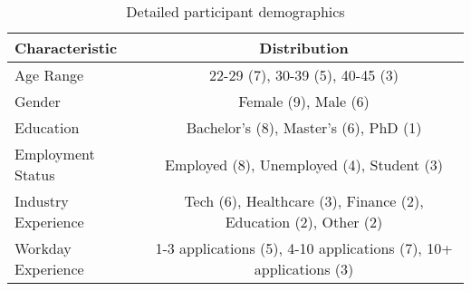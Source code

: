 \documentclass[
	letterpaper, %
]{jdf}
\begin{document}
\begin{sloppypar}
\begin{table}[h]
\centering
\begin{tabular}{|l|c|}
\hline
\textbf{Characteristic} & \textbf{Distribution} \\
\hline
Age Range & 22-29 (7), 30-39 (5), 40-45 (3) \\
\hline
Gender & Female (9), Male (6) \\
\hline
Education & Bachelor's (8), Master's (6), PhD (1) \\
\hline
Employment Status & Employed (8), Unemployed (4), Student (3) \\
\hline
Industry Experience & Tech (6), Healthcare (3), Finance (2), Education (2), Other (2) \\
\hline
Workday Experience & 1-3 applications (5), 4-10 applications (7), 10+ applications (3) \\
\hline
\end{tabular}
\caption{Detailed participant demographics}
\end{table}




\end{sloppypar}
\end{document}

